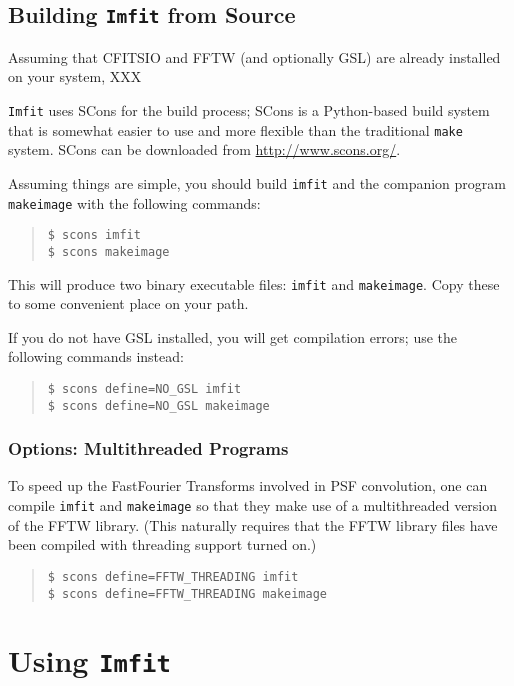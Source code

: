 \documentclass[10pt]{article}
\newcommand{\imfit}{\texttt{imfit}}
\newcommand{\Imfit}{\texttt{Imfit}}
\newcommand{\makeimage}{\texttt{makeimage}}
\begin{document}
\subsection{Building \Imfit{} from Source}

Assuming that CFITSIO and FFTW (and optionally GSL) are already installed
on your system, XXX

\Imfit{} uses SCons for the build process; SCons is a Python-based build system
that is somewhat easier to use and more flexible than the traditional \texttt{make}
system. SCons can be downloaded from \url{http://www.scons.org/}.

Assuming things are simple, you should build \imfit{} and the companion
program \makeimage{} with the following commands:
\begin{quote}
\texttt{\$ scons imfit} \\
\texttt{\$ scons makeimage}
\end{quote}
This will produce two binary executable files: \imfit{} and \makeimage{}. Copy
these to some convenient place on your path.

If you do not have GSL installed, you will get compilation errors; use the following
commands instead:
\begin{quote}
\texttt{\$ scons define=NO\_GSL imfit} \\
\texttt{\$ scons define=NO\_GSL makeimage}
\end{quote}

\subsubsection{Options: Multithreaded Programs}

To speed up the FastFourier Transforms involved in PSF convolution, one
can compile \imfit{} and \makeimage{} so that they make use of a multithreaded
version of the FFTW library.  (This naturally requires that the FFTW
library files have been compiled with threading support turned on.)

\begin{quote}
\texttt{\$ scons define=FFTW\_THREADING imfit} \\
\texttt{\$ scons define=FFTW\_THREADING makeimage}
\end{quote}





\section{Using \Imfit{}}
\end{document}
